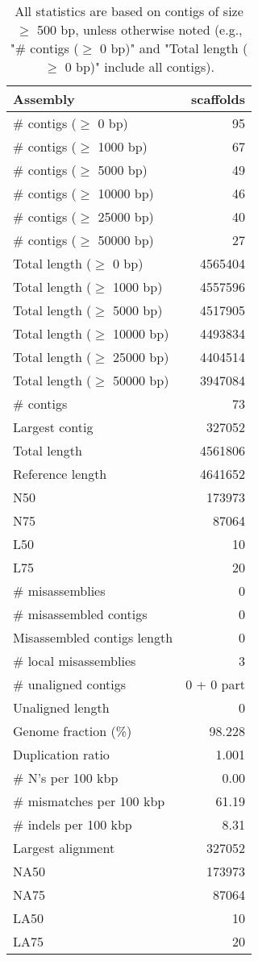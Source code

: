 \documentclass[12pt,a4paper]{article}
\begin{document}
\begin{table}[ht]
\begin{center}
\caption{All statistics are based on contigs of size $\geq$ 500 bp, unless otherwise noted (e.g., "\# contigs ($\geq$ 0 bp)" and "Total length ($\geq$ 0 bp)" include all contigs).}
\begin{tabular}{|l*{1}{|r}|}
\hline
Assembly & scaffolds \\ \hline
\# contigs ($\geq$ 0 bp) & 95 \\ \hline
\# contigs ($\geq$ 1000 bp) & 67 \\ \hline
\# contigs ($\geq$ 5000 bp) & 49 \\ \hline
\# contigs ($\geq$ 10000 bp) & 46 \\ \hline
\# contigs ($\geq$ 25000 bp) & 40 \\ \hline
\# contigs ($\geq$ 50000 bp) & 27 \\ \hline
Total length ($\geq$ 0 bp) & 4565404 \\ \hline
Total length ($\geq$ 1000 bp) & 4557596 \\ \hline
Total length ($\geq$ 5000 bp) & 4517905 \\ \hline
Total length ($\geq$ 10000 bp) & 4493834 \\ \hline
Total length ($\geq$ 25000 bp) & 4404514 \\ \hline
Total length ($\geq$ 50000 bp) & 3947084 \\ \hline
\# contigs & 73 \\ \hline
Largest contig & 327052 \\ \hline
Total length & 4561806 \\ \hline
Reference length & 4641652 \\ \hline
N50 & 173973 \\ \hline
N75 & 87064 \\ \hline
L50 & 10 \\ \hline
L75 & 20 \\ \hline
\# misassemblies & 0 \\ \hline
\# misassembled contigs & 0 \\ \hline
Misassembled contigs length & 0 \\ \hline
\# local misassemblies & 3 \\ \hline
\# unaligned contigs & 0 + 0 part \\ \hline
Unaligned length & 0 \\ \hline
Genome fraction (\%) & 98.228 \\ \hline
Duplication ratio & 1.001 \\ \hline
\# N's per 100 kbp & 0.00 \\ \hline
\# mismatches per 100 kbp & 61.19 \\ \hline
\# indels per 100 kbp & 8.31 \\ \hline
Largest alignment & 327052 \\ \hline
NA50 & 173973 \\ \hline
NA75 & 87064 \\ \hline
LA50 & 10 \\ \hline
LA75 & 20 \\ \hline
\end{tabular}
\end{center}
\end{table}
\end{document}
